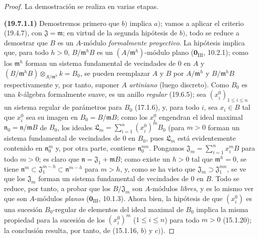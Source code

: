 \begin{proof}
La demostración se realiza en varias etapas.

\medskip
\noindent{}\label{0.19.7.1.1-fr}\textbf{(19.7.1.1)}\enspace
Demostremos primero que $b)$ implica $a)$; vamos a aplicar el criterio
(19.4.7), con $\mathfrak J=\mathfrak m$; en virtud de la segunda hipótesis
de $b)$, todo se reduce a demostrar que $B$ es un $A$-módulo
\emph{formalmente proyectivo}. La hipótesis implica que, para todo $h>0$,
$B/\mathfrak m^hB$ es un $(A/\mathfrak m^h)$-módulo plano
($\mathbf 0_{\mathrm{III}}$, 10.2.1); como los $\mathfrak m^h$ forman un
sistema fundamental de vecindades de 0 en $A$ y
$(B/\mathfrak m^hB)\otimes_{A/\mathfrak m^h}k=B_0$, se pueden reemplazar $A$ y
$B$ por $A/\mathfrak m^h$ y $B/\mathfrak m^hB$ respectivamente y, por tanto,
suponer $A$ \emph{artiniano} (luego discreto). Como $B_0$ es una $k$-álgebra
formalmente suave, es un anillo \emph{regular} (19.6.5); sea
$(x_i^0)_{1\leq i\leq n}$ un sistema regular de parámetros para $B_0$
(17.1.6), y, para todo $i$, sea $x_i\in B$ tal que $x_i^0$ sea su imagen
en $B_0=B/\mathfrak mB$; como los $x_i^0$ engendran el ideal maximal
$\mathfrak n_0=\mathfrak n/\mathfrak mB$ de $B_0$, los ideales
$\mathfrak L_m=\sum_{i=1}^n(x_i^0)^mB_0$ (para $m>0$
forman un sistema fundamental de vecindades de 0 en $B_0$, pues
$\mathfrak L_m$ está evidentemente contenido en $\mathfrak n_0^m$ y, por otra
parte, contiene $\mathfrak n_0^{mn}$. Pongamos
$\mathfrak J_m=\sum_{i=1}^n x_i^mB$ para todo $m>0$; es claro que
$\mathfrak n=\mathfrak J_1+\mathfrak mB$; como existe un $h>0$ tal que
$\mathfrak m^h=0$, se tiene
$\mathfrak n^m\subset\mathfrak J_1^{m-h}\subset\mathfrak n^{m-h}$ para
$m>h$, y, como se ha visto que $\mathfrak J_m\supset\mathfrak J_1^{mn}$, se ve
que los $\mathfrak J_m$ forman un sistema fundamental de vecindades de 0 en
$B$. Todo se reduce, por tanto, a probar que los $B/\mathfrak J_m$ son
$A$-módulos \emph{libres}, y es lo mismo ver que son
$A$-módulos \emph{planos} ($\mathbf 0_{\mathrm{III}}$, 10.1.3). Ahora bien,
la hipótesis de que $(x_i^0)$ es una sucesión $B_0$-regular de elementos del ideal
maximal de $B_0$ implica la misma propiedad para la sucesión de los $(x_i^0)^m$
($1\leq i\leq n$) para todo $m>0$ (15.1.20); la conclusión resulta, por tanto, de
(15.1.16, $b)$ y $c)$).
\end{proof}

